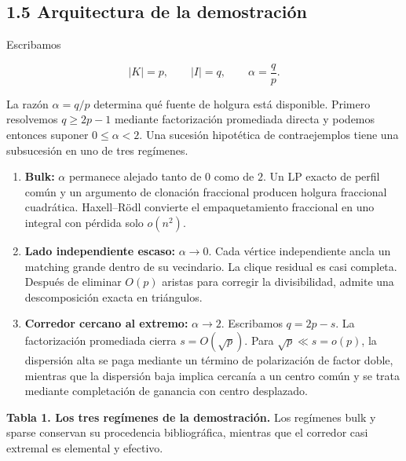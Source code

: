 \documentclass[
  spanish,
  11pt,
  a4paper,
]{article}
\begin{document}
\subsection{1.5 Arquitectura de la demostración}\label{arquitectura-de-la-demostraciuxf3n}

Escribamos

\[
|K|=p,
\qquad
|I|=q,
\qquad
\alpha=\frac qp.
\]

La razón \(\alpha=q/p\) determina qué fuente de holgura está disponible. Primero resolvemos \(q\ge2p-1\) mediante factorización promediada directa y podemos entonces suponer \(0\le\alpha<2\). Una sucesión hipotética de contraejemplos tiene una subsucesión en uno de tres regímenes.

\begin{enumerate}
\def\labelenumi{\arabic{enumi}.}
\item
  \textbf{Bulk:} \(\alpha\) permanece alejado tanto de \(0\) como de \(2\). Un LP exacto de perfil común y un argumento de clonación fraccional producen holgura fraccional cuadrática. Haxell--Rödl convierte el empaquetamiento fraccional en uno integral con pérdida solo \(o(n^2)\).
\item
  \textbf{Lado independiente escaso:} \(\alpha\to0\). Cada vértice independiente ancla un matching grande dentro de su vecindario. La clique residual es casi completa. Después de eliminar \(O(p)\) aristas para corregir la divisibilidad, admite una descomposición exacta en triángulos.
\item
  \textbf{Corredor cercano al extremo:} \(\alpha\to2\). Escribamos \(q=2p-s\). La factorización promediada cierra \(s=O(\sqrt p)\). Para \(\sqrt p\ll s=o(p)\), la dispersión alta se paga mediante un término de polarización de factor doble, mientras que la dispersión baja implica cercanía a un centro común y se trata mediante completación de ganancia con centro desplazado.
\end{enumerate}

\textbf{Tabla 1. Los tres regímenes de la demostración.} Los regímenes bulk y sparse conservan su procedencia bibliográfica, mientras que el corredor casi extremal es elemental y efectivo.
\end{document}

